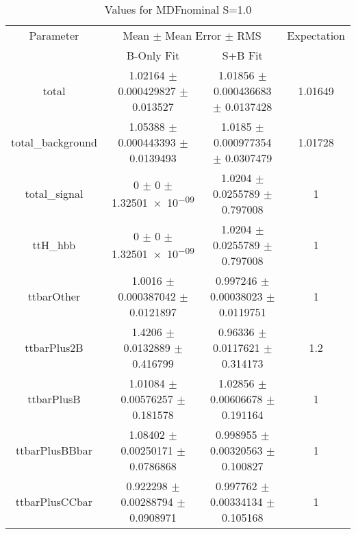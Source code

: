 \begin{table}
\centering
\caption{Values for MDFnominal S=1.0}
\begin{tabular}{cccc}
\toprule
Parameter & \multicolumn{2}{c}{Mean $\pm$ Mean Error $\pm$ RMS} & Expectation\\
 & B-Only Fit & S+B Fit & \\
\midrule
total & \num{1.02164} $\pm$ \num{0.000429827} $\pm$ \num{0.013527} & \num{1.01856} $\pm$ \num{0.000436683} $\pm$ \num{0.0137428} & \num{1.01649}\\
total\_background & \num{1.05388} $\pm$ \num{0.000443393} $\pm$ \num{0.0139493} & \num{1.0185} $\pm$ \num{0.000977354} $\pm$ \num{0.0307479} & \num{1.01728}\\
total\_signal & \num{0} $\pm$ \num{0} $\pm$ \num{1.32501e-09} & \num{1.0204} $\pm$ \num{0.0255789} $\pm$ \num{0.797008} & \num{1}\\
ttH\_hbb & \num{0} $\pm$ \num{0} $\pm$ \num{1.32501e-09} & \num{1.0204} $\pm$ \num{0.0255789} $\pm$ \num{0.797008} & \num{1}\\
ttbarOther & \num{1.0016} $\pm$ \num{0.000387042} $\pm$ \num{0.0121897} & \num{0.997246} $\pm$ \num{0.00038023} $\pm$ \num{0.0119751} & \num{1}\\
ttbarPlus2B & \num{1.4206} $\pm$ \num{0.0132889} $\pm$ \num{0.416799} & \num{0.96336} $\pm$ \num{0.0117621} $\pm$ \num{0.314173} & \num{1.2}\\
ttbarPlusB & \num{1.01084} $\pm$ \num{0.00576257} $\pm$ \num{0.181578} & \num{1.02856} $\pm$ \num{0.00606678} $\pm$ \num{0.191164} & \num{1}\\
ttbarPlusBBbar & \num{1.08402} $\pm$ \num{0.00250171} $\pm$ \num{0.0786868} & \num{0.998955} $\pm$ \num{0.00320563} $\pm$ \num{0.100827} & \num{1}\\
ttbarPlusCCbar & \num{0.922298} $\pm$ \num{0.00288794} $\pm$ \num{0.0908971} & \num{0.997762} $\pm$ \num{0.00334134} $\pm$ \num{0.105168} & \num{1}\\
\bottomrule
\end{tabular}
\end{table}